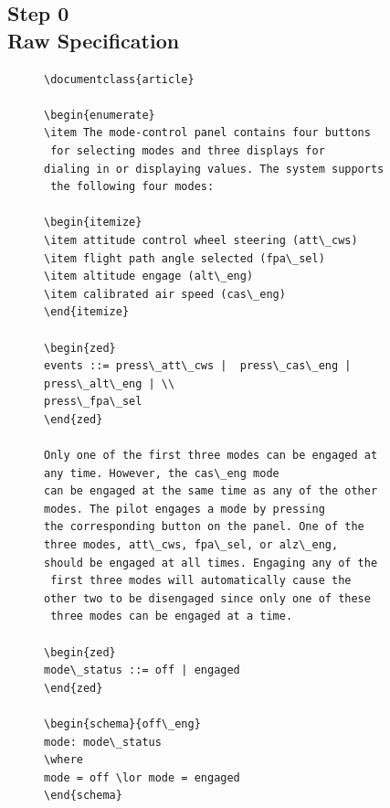 \subsection{Step 0\\Raw Specification}

 \begin{figure}[H]
     \vspace{-0.2in}
     \centering
     \begin{minipage}{0.45\textwidth}
     \centering
     \begin{tiny}
     \begin{BVerbatim}
\documentclass{article}
        
\begin{enumerate}
\item The mode-control panel contains four buttons
 for selecting modes and three displays for
dialing in or displaying values. The system supports
 the following four modes:
           
\begin{itemize}
\item attitude control wheel steering (att\_cws)
\item flight path angle selected (fpa\_sel)
\item altitude engage (alt\_eng)
\item calibrated air speed (cas\_eng)
\end{itemize}
          
\begin{zed}
events ::= press\_att\_cws |  press\_cas\_eng | 
press\_alt\_eng | \\
press\_fpa\_sel
\end{zed}
          
Only one of the first three modes can be engaged at 
any time. However, the cas\_eng mode
can be engaged at the same time as any of the other 
modes. The pilot engages a mode by pressing
the corresponding button on the panel. One of the 
three modes, att\_cws, fpa\_sel, or alz\_eng,
should be engaged at all times. Engaging any of the
 first three modes will automatically cause the
other two to be disengaged since only one of these
 three modes can be engaged at a time.
           
\begin{zed}
mode\_status ::= off | engaged
\end{zed}
      
\begin{schema}{off\_eng}
mode: mode\_status
\where
mode = off \lor mode = engaged
\end{schema}
           

\end{BVerbatim}
\end{tiny}
\end{minipage}
\end{figure}
